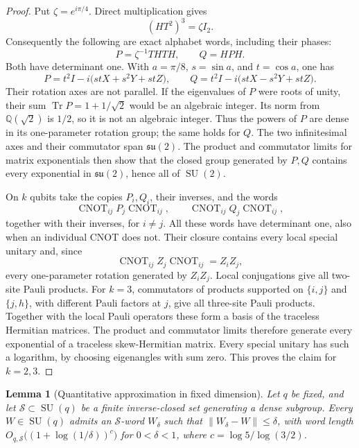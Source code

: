 \documentclass[11pt]{article}
\newtheorem{lemma}[theorem]{Lemma}
\begin{document}
\begin{proof}
Put $\zeta=e^{i\pi/4}$. Direct multiplication gives
\begin{equation}
 (HT^2)^3=\zeta I_2.
\end{equation}
Consequently the following are exact alphabet words, including their phases:
\begin{equation}
 P=\zeta^{-1}THTH,\qquad Q=HPH.
\end{equation}
Both have determinant one. With $a=\pi/8$, $s=\sin a$, and $t=\cos a$,
one has
\begin{equation}
 P=t^2I-i\bigl(stX+s^2Y+stZ\bigr),\qquad
 Q=t^2I-i\bigl(stX-s^2Y+stZ\bigr).
\end{equation}
Their rotation axes are not parallel. If the eigenvalues of $P$ were roots
of unity, their sum $\operatorname{Tr}P=1+1/\sqrt2$ would be an algebraic
integer. Its norm from $\mathbb Q(\sqrt2)$ is $1/2$, so it is not an
algebraic integer. Thus the powers of $P$ are dense in its one-parameter
rotation group; the same holds for $Q$. The two infinitesimal axes and their
commutator span $\mathfrak{su}(2)$. The product and commutator limits for
matrix exponentials then show that the closed group generated by $P,Q$
contains every exponential in $\mathfrak{su}(2)$, hence all of
$\operatorname{SU}(2)$.

On $k$ qubits take the copies $P_i,Q_i$, their inverses, and the words
\[
 \operatorname{CNOT}_{ij}P_j\operatorname{CNOT}_{ij},\qquad
 \operatorname{CNOT}_{ij}Q_j\operatorname{CNOT}_{ij},
\]
together with their inverses, for $i\ne j$. All these words have
determinant one, also when an individual CNOT does not. Their closure contains every local special unitary and, since
\begin{equation}
 \operatorname{CNOT}_{ij} Z_j\operatorname{CNOT}_{ij}=Z_iZ_j,
\end{equation}
every one-parameter rotation generated by $Z_iZ_j$. Local conjugations give
all two-site Pauli products. For $k=3$, commutators of products supported on
$\{i,j\}$ and $\{j,h\}$, with different Pauli factors at $j$, give all
three-site Pauli products. Together with the local Pauli operators these
form a basis of the traceless Hermitian matrices. The product and commutator
limits therefore generate every exponential of a traceless skew-Hermitian
matrix. Every special unitary has such a logarithm, by choosing eigenangles
with sum zero. This proves the claim for $k=2,3$.
\end{proof}

\begin{lemma}[Quantitative approximation in fixed dimension]
\label{lem:finite-gate-quantitative-su}
Let $q$ be fixed, and let $\mathcal S\subset\operatorname{SU}(q)$ be a
finite inverse-closed set generating a dense subgroup. Every
$W\in\operatorname{SU}(q)$ admits an $\mathcal S$-word $W_\delta$ such
that $\|W_\delta-W\|\leq\delta$, with word length
$O_{q,\mathcal S}\bigl((1+\log(1/\delta))^c\bigr)$ for $0<\delta<1$,
where $c=\log5/\log(3/2)$.
\end{lemma}
\end{document}
